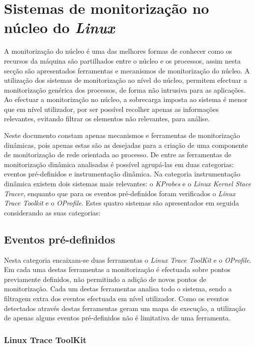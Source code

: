 \section{Sistemas de monitorização no núcleo do \textit{Linux}}\label{sect:instrumentacao_casos_linux}

A monitorização do núcleo é uma das melhores formas de conhecer como os recursos da máquina são partilhados entre o núcleo e os processos, assim nesta secção são apresentados ferramentas e mecanismos de monitorização do núcleo.
A utilização dos sistemas de monitorização ao nível do núcleo, permitem efectuar a monitorização genérica dos processos, de forma não intrusiva para as aplicações.
Ao efectuar a monitorização no núcleo, a sobrecarga imposta ao sistema é menor que em nível utilizador, por ser possível recolher apenas as informações relevantes, evitando filtrar os elementos não relevantes, para análise.

Neste documento constam apenas mecanismos e ferramentas de monitorização dinâmicas, pois apenas estas são as desejadas para a criação de uma componente de monitorização de rede orientada ao processo.
De entre as ferramentas de monitorização dinâmica analisadas é possível agrupá-las em duas categorias: eventos pré-definidos e instrumentação dinâmica.
Na categoria instrumentação dinâmica existem dois sistemas mais relevantes: o \textit{KProbes} e o \textit{Linux Kernel Stace Tracer}, enquanto que para os eventos pré-definidos foram verificados o \textit{Linux Trace Toolkit} e o \textit{OProfile}.
Estes quatro sistemas são apresentados em seguida considerando as suas categorias:

\subsection{Eventos pré-definidos}

Nesta categoria encaixam-se duas ferramentas o \textit{Linux Trace ToolKit} e o \textit{OProfile}.
Em cada uma destas ferramentas a monitorização é efectuada sobre pontos previamente definidos, não permitindo a adição de novos pontos de monitorização.
Cada um destas ferramentas analisa todo o sistema, sendo a filtragem extra dos eventos efectuada em nível utilizador.
Como os eventos detectados através destas ferramentas geram um mapa de execução, a utilização de apenas alguns eventos pré-definidos não é limitativa de uma ferramenta.

\subsubsection{Linux Trace ToolKit}\label{cap:linux_trace_toolkit_overview}

